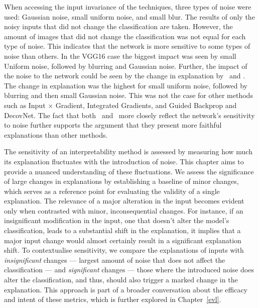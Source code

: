 When accessing the input invariance of the techniques, three types of noise were used: Gaussian noise, small uniform noise, and small blur. The results of only the noisy inputs that did not change the classification are taken. However, the amount of images that did not change the classification was not equal for each type of noise. This indicates that the network is more sensitive to some types of noise than others. In the VGG16 case the biggest impact was seen by small Uniform noise, followed by blurring and Gaussian noise. Further, the impact of the noise to the network could be seen by the change in explanation by \CTC\ and \LRP. The change in explanation was the highest for small uniform noise, followed by blurring and then small Gaussian noise. This was not the case for other methods such as Input $\times$ Gradient, Integrated Gradients, and Guided Backprop and DecovNet. The fact that both \LRP\ and \CTC\ more closely reflect the network's sensitivity to noise further supports the argument that they present more faithful explanations than other methods.


The sensitivity of an interpretability method is assessed by measuring how much its explanation fluctuates with the introduction of noise. This chapter aims to provide a nuanced understanding of these fluctuations. We assess the significance of large changes in explanations by establishing a baseline of minor changes, which serves as a reference point for evaluating the validity of a single explanation. The relevance of a major alteration in the input becomes evident only when contrasted with minor, inconsequential changes. For instance, if an insignificant modification in the input, one that doesn't alter the model's classification, leads to a substantial shift in the explanation, it implies that a major input change would almost certainly result in a significant explanation shift. To contextualise sensitivity, we compare the explanations of inputs with \emph{insignificant} changes --- largest amount of noise that does not affect the classification --- and \emph{significant} changes --- those where the introduced noise does alter the classification, and thus, should also trigger a marked change in the explanation. This approach is part of a broader conversation about the efficacy and intent of these metrics, which is further explored in Chapter~\ref{evl}.

